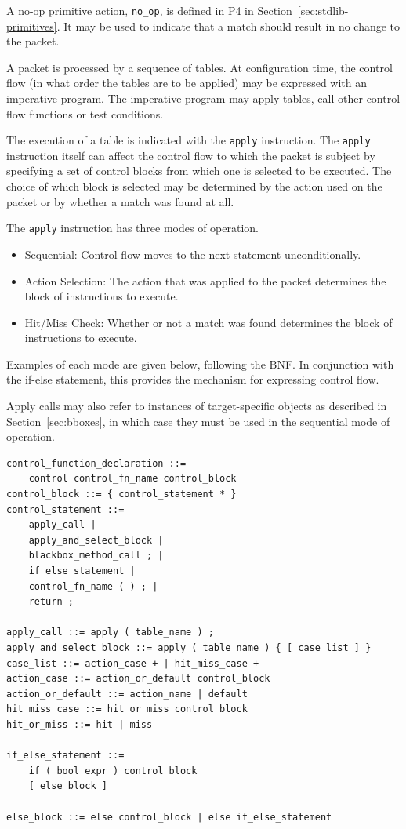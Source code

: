\documentclass[12pt]{article}
\begin{document}
A no-op primitive action, \texttt{no_op}, is defined in P4 in 
Section~\ref{sec:stdlib-primitives}. It may be used to indicate that 
a match should result in no change to the packet.


A packet is processed by a sequence of \matchaction tables.  At configuration 
time, the control flow (in what order the tables are to be applied) may be 
expressed with an imperative program. The imperative program may apply tables, 
call other control flow functions or test conditions.

The execution of a table is indicated with the \texttt{apply} instruction.
The \texttt{apply} instruction itself can affect the control flow to which the
packet is subject by specifying a set of control blocks from which one is
selected to be executed. The choice of which block is selected may be
determined by the action used on the packet  or by whether a match was found
at all.

The \texttt{apply} instruction has three modes of operation.

\begin{itemize}
\item
Sequential: Control flow moves to the next statement unconditionally.
\item
Action Selection: The action that was applied to the packet determines the 
block of instructions to execute.
\item
Hit/Miss Check: Whether or not a match was found determines the block of instructions 
to execute.
\end{itemize}

Examples of each mode are given below, following the BNF. In conjunction with 
the if-else statement, this provides the mechanism for expressing control 
flow.

Apply calls may also refer to instances of target-specific objects as described
in Section~\ref{sec:bboxes}, in which case they must be used in the
sequential mode of operation.

\begin{lstlisting}[style=BNFstyle]
control_function_declaration ::=
    control control_fn_name control_block
control_block ::= { control_statement * }
control_statement ::= 
    apply_call |
    apply_and_select_block |
    blackbox_method_call ; |
    if_else_statement |
    control_fn_name ( ) ; |
    return ;

apply_call ::= apply ( table_name ) ;
apply_and_select_block ::= apply ( table_name ) { [ case_list ] }
case_list ::= action_case + | hit_miss_case +
action_case ::= action_or_default control_block
action_or_default ::= action_name | default
hit_miss_case ::= hit_or_miss control_block
hit_or_miss ::= hit | miss

if_else_statement ::=
    if ( bool_expr ) control_block
    [ else_block ]

else_block ::= else control_block | else if_else_statement

\end{lstlisting}
\end{document}
